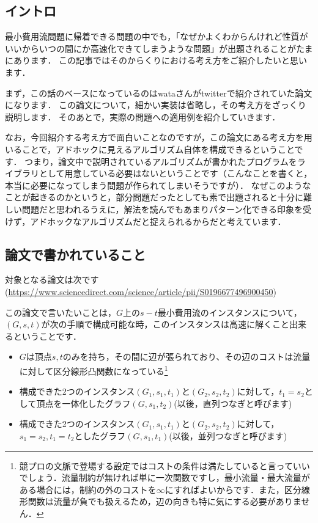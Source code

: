 \documentclass[13pt]{jarticle}
\begin{document}
\subsection{イントロ}

最小費用流問題に帰着できる問題の中でも，「なぜかよくわからんけれど性質がいいからいつの間にか高速化できてしまうような問題」が出題されることがたまにあります．
この記事ではそのからくりにおける考え方をご紹介したいと思います．

まず，この話のベースになっているのはwataさんがtwitterで紹介されていた論文になります．
この論文について，細かい実装は省略し，その考え方をざっくり説明します．
そのあとで，実際の問題への適用例を紹介していきます．

なお，今回紹介する考え方で面白いことなのですが，この論文にある考え方を用いることで，アドホックに見えるアルゴリズム自体を構成できるということです．
つまり，論文中で説明されているアルゴリズムが書かれたプログラムをライブラリとして用意している必要はないということです（こんなことを書くと，本当に必要になってしまう問題が作られてしまいそうですが）．
なぜこのようなことが起きるのかというと，部分問題だったとしても素で出題されると十分に難しい問題だと思われるうえに，解法を読んでもあまりパターン化できる印象を受けず，アドホックなアルゴリズムだと捉えられるからだと考えています．


\subsection{論文で書かれていること}
対象となる論文は次です(\url{https://www.sciencedirect.com/science/article/pii/S0196677496900450})

この論文で言いたいことは，$G$上の$s - t$最小費用流のインスタンスについて，$(G, s, t)$が次の手順で構成可能な時，このインスタンスは高速に解くこと出来るということです．

\begin{itemize}
\item $G$は頂点$s, t$のみを持ち，その間に辺が張られており、その辺のコストは流量に対して区分線形凸関数になっている\footnote{競プロの文脈で登場する設定ではコストの条件は満たしていると言っていいでしょう．流量制約が無ければ単に一次関数ですし，最小流量・最大流量がある場合には，制約の外のコストを$\infty$にすればよいからです．また，区分線形関数は流量が負でも扱えるため，辺の向きも特に気にする必要がありません．}
\item 構成できた2つのインスタンス$(G_1, s_1, t_1)$と$(G_2, s_2, t_2)$に対して，$t_1=s_2$として頂点を一体化したグラフ$(G, s_1, t_2)$(以後，直列つなぎと呼びます)
\item 構成できた2つのインスタンス$(G_1, s_1, t_1)$と$(G_2, s_2, t_2)$に対して，$s_1=s_2, t_1=t_2$としたグラフ$(G, s_1, t_1)$(以後，並列つなぎと呼びます)
\end{itemize}
\end{document}
